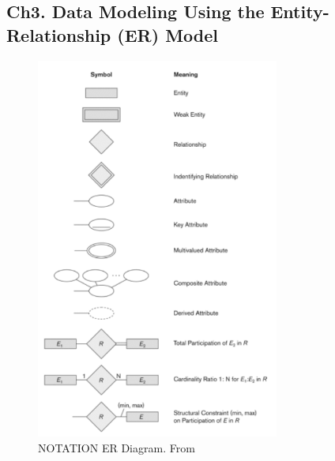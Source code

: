 \begin{multicols}{2}
\section{Ch3. Data Modeling Using the Entity-Relationship (ER) Model}
\begin{figure}[H]
    \centering
    \includegraphics[width=8cm]{image/notation-er-diagrams.pdf}
    \caption{NOTATION ER Diagram. From \cite{dd}}
\end{figure}


\end{multicols}
